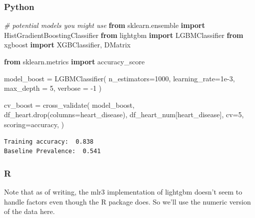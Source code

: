 \documentclass[
  letterpaper,
]{krantz}
\newenvironment{Shaded}{}{}
\newcommand{\CommentTok}[1]{\textcolor[rgb]{0.38,0.63,0.69}{\textit{#1}}}
\newcommand{\DecValTok}[1]{\textcolor[rgb]{0.25,0.63,0.44}{#1}}
\newcommand{\FloatTok}[1]{\textcolor[rgb]{0.25,0.63,0.44}{#1}}
\newcommand{\ImportTok}[1]{\textcolor[rgb]{0.00,0.50,0.00}{\textbf{#1}}}
\newcommand{\NormalTok}[1]{#1}
\newcommand{\OperatorTok}[1]{\textcolor[rgb]{0.40,0.40,0.40}{#1}}
\newcommand{\StringTok}[1]{\textcolor[rgb]{0.25,0.44,0.63}{#1}}
\begin{document}
\subsubsection{Python}

\begin{Shaded}
\begin{Highlighting}[]
\CommentTok{\# potential models you might use}
\ImportTok{from}\NormalTok{ sklearn.ensemble }\ImportTok{import}\NormalTok{ HistGradientBoostingClassifier}
\ImportTok{from}\NormalTok{ lightgbm }\ImportTok{import}\NormalTok{ LGBMClassifier}
\ImportTok{from}\NormalTok{ xgboost }\ImportTok{import}\NormalTok{ XGBClassifier, DMatrix}

\ImportTok{from}\NormalTok{ sklearn.metrics }\ImportTok{import}\NormalTok{ accuracy\_score}

\NormalTok{model\_boost }\OperatorTok{=}\NormalTok{ LGBMClassifier(}
\NormalTok{    n\_estimators}\OperatorTok{=}\DecValTok{1000}\NormalTok{,}
\NormalTok{    learning\_rate}\OperatorTok{=}\FloatTok{1e{-}3}\NormalTok{,}
\NormalTok{    max\_depth }\OperatorTok{=} \DecValTok{5}\NormalTok{,}
\NormalTok{    verbose }\OperatorTok{=} \OperatorTok{{-}}\DecValTok{1}
\NormalTok{)}

\NormalTok{cv\_boost }\OperatorTok{=}\NormalTok{ cross\_validate(}
\NormalTok{    model\_boost,}
\NormalTok{    df\_heart.drop(columns}\OperatorTok{=}\StringTok{\textquotesingle{}heart\_disease\textquotesingle{}}\NormalTok{),}
\NormalTok{    df\_heart\_num[}\StringTok{\textquotesingle{}heart\_disease\textquotesingle{}}\NormalTok{],}
\NormalTok{    cv}\OperatorTok{=}\DecValTok{5}\NormalTok{,}
\NormalTok{    scoring}\OperatorTok{=}\StringTok{\textquotesingle{}accuracy\textquotesingle{}}\NormalTok{,}
\NormalTok{)}
\end{Highlighting}
\end{Shaded}

\begin{verbatim}
Training accuracy:  0.838 
Baseline Prevalence:  0.541
\end{verbatim}

\subsubsection{R}

Note that as of writing, the mlr3 implementation of lightgbm doesn't
seem to handle factors even though the R package does. So we'll use the
numeric version of the data here.
\end{document}
